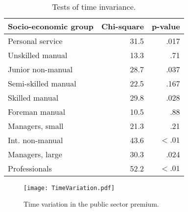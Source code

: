 \documentclass[a4paper,11pt,titlepage]{article}
\begin{document}
\begin{comment}
Not sure whether to include a discussion of this or not.
\end{comment}

\begin{table}[ht]
    \caption{Tests of time invariance. \label{tab:time}}
    \begin{center}
    \begin{tabular}{lrr}
    \toprule
    Socio-economic group & Chi-square & p-value \\
    \midrule
    Personal service & 31.5 & .017 \\
    Unskilled manual & 13.3 & .71 \\
    Junior non-manual & 28.7 & .037 \\
    Semi-skilled manual & 22.5 & .167 \\
    Skilled manual & 29.8 & .028 \\
    Foreman manual & 10.5 & .88 \\
    Managers, small & 21.3 & .21 \\
    Int. non-manual & 43.6 & $ < .01 $\\
    Managers, large&30.3 & .024 \\
    Professionals & 52.2 & $< .01$ \\
    \bottomrule
    \end{tabular}
    \end{center}
\end{table}

\begin{figure}[ht]
    \texttt{[image: TimeVariation.pdf]}
    \caption{Time variation in the public sector premium. \label{fig:time}}
\end{figure}

\clearpage

\end{document}
